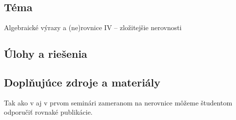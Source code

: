 
\subsection*{Téma}
Algebraické výrazy a (ne)rovnice IV -- zložitejšie nerovnosti


\subsection*{Úlohy a riešenia}















\subsection*{Doplňujúce zdroje a materiály}

Tak ako v aj v prvom seminári zameranom na nerovnice môžeme študentom odporučiť rovnaké publikácie. 







